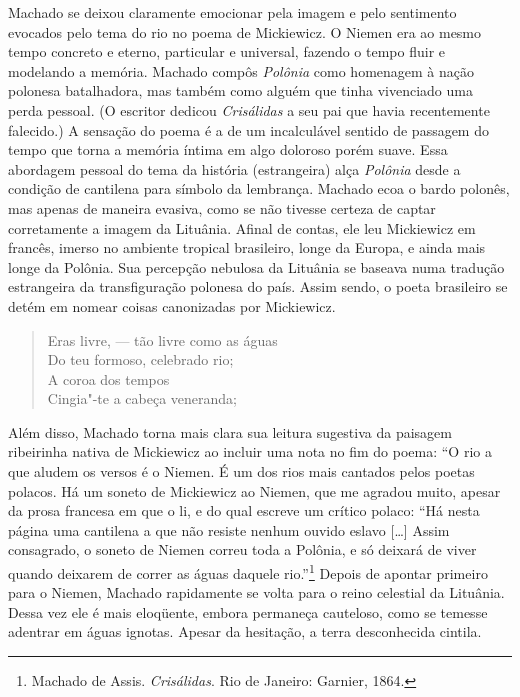 Machado se deixou claramente emocionar pela imagem e pelo sentimento
evocados pelo tema do rio no poema de Mickiewicz. O Niemen era ao mesmo
tempo concreto e eterno, particular e universal, fazendo o tempo fluir e
modelando a memória. Machado compôs \emph{Polônia} como homenagem à
nação polonesa batalhadora, mas também como alguém que tinha vivenciado
uma perda pessoal. (O escritor dedicou \emph{Crisálidas} a seu pai que
havia recentemente falecido.) A sensação do poema é a de um incalculável
sentido de passagem do tempo que torna a memória íntima em algo doloroso
porém suave. Essa abordagem pessoal do tema da história (estrangeira)
alça \emph{Polônia} desde a condição de cantilena para símbolo da
lembrança. Machado ecoa o bardo polonês, mas apenas de maneira evasiva,
como se não tivesse certeza de captar corretamente a imagem da Lituânia.
Afinal de contas, ele leu Mickiewicz em francês, imerso no ambiente
tropical brasileiro, longe da Europa, e ainda mais longe da Polônia. Sua
percepção nebulosa da Lituânia se baseava numa tradução estrangeira da
transfiguração polonesa do país. Assim sendo, o poeta brasileiro se
detém em nomear coisas canonizadas por Mickiewicz.

\begin{verse}
Eras livre, --- tão livre como as águas \\
Do teu formoso, celebrado rio;\\
A coroa dos tempos\\
Cingia"-te a cabeça veneranda;
\end{verse}

Além disso, Machado torna mais clara sua leitura sugestiva da paisagem
ribeirinha nativa de Mickiewicz ao incluir uma nota no fim do poema: ``O
rio a que aludem os versos é o Niemen. É um dos rios mais cantados pelos
poetas polacos. Há um soneto de Mickiewicz ao Niemen, que me agradou
muito, apesar da prosa francesa em que o li, e do qual escreve um
crítico polaco: ``Há nesta página uma cantilena a que não resiste nenhum
ouvido eslavo {[}\ldots{}{]} Assim consagrado, o soneto de Niemen correu
toda a Polônia, e só deixará de viver quando deixarem de correr as águas
daquele rio.''\footnote{Machado de Assis. \textit{Crisálidas}. Rio de Janeiro: Garnier, 1864.} Depois de apontar primeiro para o Niemen,
Machado rapidamente se volta para o reino celestial da Lituânia. Dessa
vez ele é mais eloqüente, embora permaneça cauteloso, como se temesse
adentrar em águas ignotas. Apesar da hesitação, a terra desconhecida
cintila.

